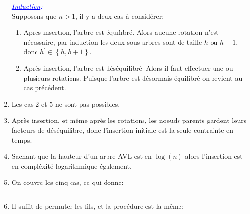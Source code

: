 \documentclass[article,11pt]{article}
\newcommand{\bgbr}[1]{
    \left\{#1\right\}
}
\begin{document}
\begin{enumerate}
\textsl{\textcolor{blue}{\underline{Induction}:}}\\
Supposons que $n>1$, il y a deux cas à considérer:
\begin{enumerate}[label=-]
\item Après insertion, l'arbre est équilibré. Alors aucune rotation n'est nécessaire, par induction les deux sous-arbres sont de taille $h$ ou $h-1$, donc $h^{'}\in\bgbr{h,h+1}$.
\item Après insertion, l'arbre est déséquilibré. Alors il faut effectuer une ou plusieurs rotations. Puisque l'arbre est désormais équilibré on revient au cas précédent.
\end{enumerate}
\item Les cas $2$ et $5$ ne sont pas possibles.
\item Après insertion, et même après les rotations, les noeuds parents gardent leurs facteurs de déséquilibre, donc l'insertion initiale est la seule contrainte en temps.
\item Sachant que la hauteur d'un arbre AVL est en $\log(n)$ alors l'insertion est en compléxité logarithmique également.
\item On couvre les cinq cas, ce qui donne:
\inputminted[fontsize=\small,firstline=31,lastline=37]{ocaml}{part4.ml}
\item Il suffit de permuter les fils, et la procédure est la même:
\inputminted[fontsize=\small,firstline=38,lastline=44]{ocaml}{part4.ml}
\end{enumerate}
\end{document}
